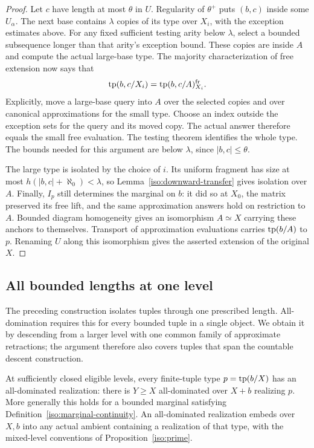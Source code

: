 \begin{proof}
Let $c$ have length at most $\theta$ in $U$. Regularity of $\theta^+$
puts $(b,c)$ inside some $U_\alpha$. The next base contains $\lambda$
copies of its type over $X_i$, with the exception estimates above.
For any fixed sufficient testing arity below $\lambda$, select a
bounded subsequence longer than that arity's exception bound. These
copies are inside $A$ and compute the actual large-base type. The
majority characterization of free extension now says that
\[
 \operatorname{tp}(b,c/X_i)=\operatorname{tp}(b,c/A)^{\mathrm{fr}}_{X_i}.
\]
Explicitly, move a large-base query into $A$ over the selected copies
and over canonical approximations for the small type. Choose an index
outside the exception sets for the query and its moved copy. The
actual answer therefore equals the small free evaluation. The
testing theorem identifies the whole type. The bounds needed for
this argument are below $\lambda$, since $|b,c|\leq\theta$.

The large type is isolated by the choice of $i$. Its uniform fragment
has size at most $h(|b,c|+\aleph_0)<\lambda$, so
Lemma~\ref{iso:downward-transfer} gives isolation over $A$. Finally,
$I_p$ still determines the marginal on $b$: it did so at $X_0$, the
matrix preserved its free lift, and the same approximation answers
hold on restriction to $A$. Bounded diagram homogeneity gives an
isomorphism $A\simeq X$ carrying these anchors to themselves.
Transport of approximation evaluations carries $\operatorname{tp}(b/A)$ to $p$.
Renaming $U$ along this isomorphism gives the asserted extension of
the original $X$.
\end{proof}

\subsection{All bounded lengths at one level}

The preceding construction isolates tuples through one prescribed length.
All-domination requires this for every bounded tuple in a single object.
We obtain it by descending from a larger level with one common family of
approximate retractions; the argument therefore also covers tuples that
span the countable descent construction.

\begin{theorem}\label{iso:all-lengths}
At sufficiently closed eligible levels, every finite-tuple type
$p=\operatorname{tp}(b/X)$ has an all-dominated realization: there is $Y\geq X$
all-dominated over $X+b$ realizing $p$. More generally this holds for
a bounded marginal satisfying Definition~\ref{iso:marginal-continuity}.
An all-dominated realization embeds over $X,b$ into any actual ambient
containing a realization of that type, with the mixed-level conventions
of Proposition~\ref{iso:prime}.
\end{theorem}

